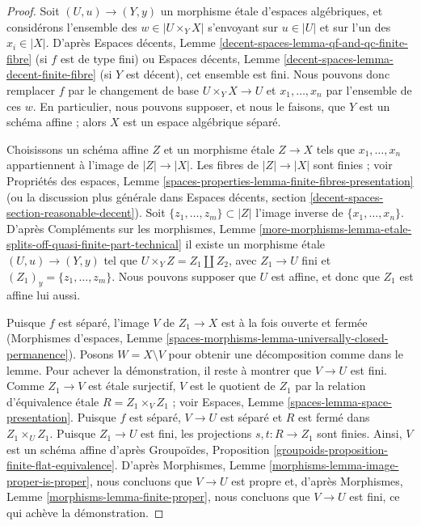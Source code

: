 \begin{proof}
Soit $(U, u) \to (Y, y)$ un morphisme étale d'espaces algébriques,
et considérons l'ensemble des $w \in |U \times_Y X|$ s'envoyant sur $u \in |U|$
et sur l'un des $x_i \in |X|$. D'après
Espaces décents, Lemme \ref{decent-spaces-lemma-qf-and-qc-finite-fibre}
(si $f$ est de type fini) ou
Espaces décents, Lemme \ref{decent-spaces-lemma-decent-finite-fibre}
(si $Y$ est décent), cet ensemble est fini.
Nous pouvons donc remplacer $f$ par le changement de base
$U \times_Y X \to U$ et $x_1, \ldots, x_n$ par l'ensemble de ces $w$.
En particulier, nous pouvons supposer, et nous le faisons, que $Y$ est un schéma affine ;
alors $X$ est un espace algébrique séparé.

\medskip\noindent
Choisissons un schéma affine $Z$ et un morphisme étale $Z \to X$ tels que
$x_1, \ldots, x_n$ appartiennent à l'image de $|Z| \to |X|$. Les fibres de
$|Z| \to |X|$ sont finies ; voir Propriétés des espaces, Lemme
\ref{spaces-properties-lemma-finite-fibres-presentation}
(ou la discussion plus générale dans Espaces décents, section
\ref{decent-spaces-section-reasonable-decent}).
Soit $\{z_1, \ldots, z_m\} \subset |Z|$ l'image inverse de
$\{x_1, \ldots, x_n\}$. D'après Compléments sur les morphismes, Lemme
\ref{more-morphisms-lemma-etale-splits-off-quasi-finite-part-technical}
il existe un morphisme étale $(U, u) \to (Y, y)$ tel
que $U \times_Y Z = Z_1 \amalg Z_2$, avec $Z_1 \to U$ fini et
$(Z_1)_y = \{z_1, \ldots, z_m\}$. Nous pouvons supposer que $U$ est affine,
et donc que $Z_1$ est affine lui aussi.

\medskip\noindent
Puisque $f$ est séparé, l'image $V$ de $Z_1 \to X$ est à la fois ouverte et fermée
(Morphismes d'espaces, Lemme
\ref{spaces-morphisms-lemma-universally-closed-permanence}).
Posons $W = X \setminus V$ pour obtenir une décomposition comme dans le lemme.
Pour achever la démonstration, il reste à montrer que $V \to U$ est fini.
Comme $Z_1 \to V$ est étale surjectif, $V$ est le quotient de
$Z_1$ par la relation d'équivalence étale $R = Z_1 \times_V Z_1$ ; voir
Espaces, Lemme \ref{spaces-lemma-space-presentation}.
Puisque $f$ est séparé, $V \to U$ est séparé et $R$ est fermé dans
$Z_1 \times_U Z_1$. Puisque $Z_1 \to U$ est fini,
les projections $s, t : R \to Z_1$ sont finies.
Ainsi, $V$ est un schéma affine d'après
Groupoïdes, Proposition \ref{groupoids-proposition-finite-flat-equivalence}.
D'après Morphismes, Lemme \ref{morphisms-lemma-image-proper-is-proper},
nous concluons que $V \to U$ est propre et, d'après
Morphismes, Lemme \ref{morphisms-lemma-finite-proper},
nous concluons que $V \to U$ est fini,
ce qui achève la démonstration.
\end{proof}

